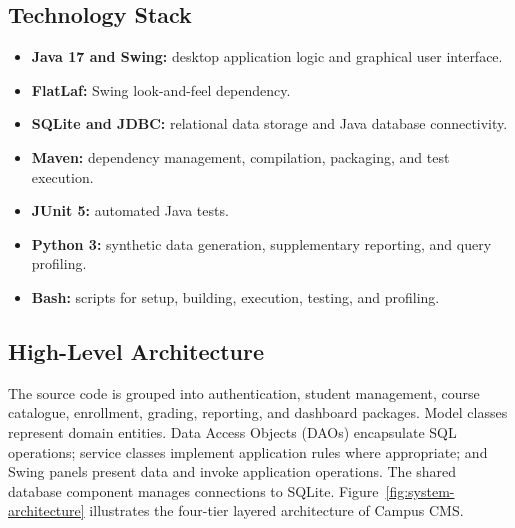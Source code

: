 \subsection{Technology Stack}
\begin{itemize}
    \item \textbf{Java 17 and Swing:} desktop application logic and graphical user interface.
    \item \textbf{FlatLaf:} Swing look-and-feel dependency.
    \item \textbf{SQLite and JDBC:} relational data storage and Java database connectivity.
    \item \textbf{Maven:} dependency management, compilation, packaging, and test execution.
    \item \textbf{JUnit 5:} automated Java tests.
    \item \textbf{Python 3:} synthetic data generation, supplementary reporting, and query profiling.
    \item \textbf{Bash:} scripts for setup, building, execution, testing, and profiling.
\end{itemize}

\subsection{High-Level Architecture}
The source code is grouped into authentication, student management, course catalogue, enrollment, grading, reporting, and dashboard packages. Model classes represent domain entities. Data Access Objects (DAOs) encapsulate SQL operations; service classes implement application rules where appropriate; and Swing panels present data and invoke application operations. The shared database component manages connections to SQLite. Figure~\ref{fig:system-architecture} illustrates the four-tier layered architecture of Campus CMS.

